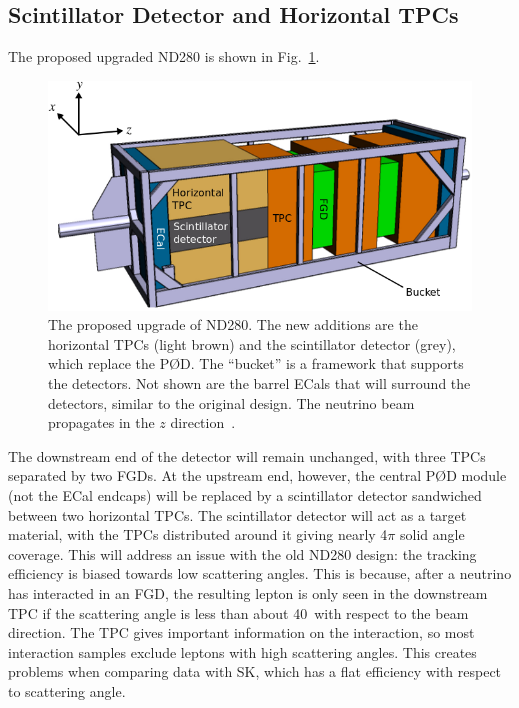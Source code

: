 \documentclass[aps,pra,12pt,notitlepage,tightenlines]{revtex4-1}
\begin{document}
\subsection{Scintillator Detector and Horizontal TPCs}
The proposed upgraded ND280 is shown in Fig.\ \ref{fig:up}.
\begin{figure}
 \includegraphics[scale=0.5]{upgrade2.png}
 \caption{The proposed upgrade of ND280. The new additions are the horizontal TPCs (light brown) and the scintillator detector (grey), which replace the P\O D. The ``bucket'' is a framework that supports the detectors. Not shown are the barrel ECals that will surround the detectors, similar to the original design. The neutrino beam propagates in the $z$ direction~\cite{Blondel:2299599}.}
 \label{fig:up}
\end{figure}
The downstream end of the detector will remain unchanged, with three TPCs separated by two FGDs. At the upstream end, however, the central P\O D module (not the ECal endcaps) will be replaced by a scintillator detector sandwiched between two horizontal TPCs. The scintillator detector will act as a target material, with the TPCs distributed around it giving nearly 4$\pi$ solid angle coverage. This  will address an issue with the old ND280 design: the tracking efficiency is biased towards low scattering angles. This is because, after a neutrino has interacted in an FGD, the resulting lepton is only seen in the downstream TPC if the scattering angle is less than about 40\degree\ with respect to the beam direction. The TPC gives important information on the interaction, so most interaction samples exclude leptons with high scattering angles. This creates problems when comparing data with SK, which has a flat efficiency with respect to scattering angle.
\end{document}
